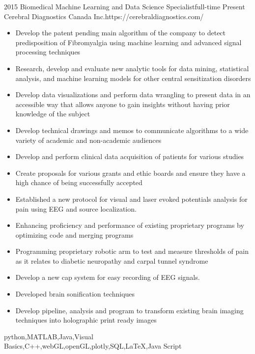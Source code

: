 \begin{experiences}
	\myExperience
	{2015}       {Biomedical Machine Learning and Data Science Specialist}{full-time}
	{Present}      {Cerebral Diagnostics Canada Inc.}{https://cerebraldiagnostics.com/}
	{
		\begin{itemize}
			\item  Develop the patent pending main algorithm of the company to detect predisposition of Fibromyalgia using machine learning and advanced signal processing techniques
			\item Research, develop and evaluate new analytic tools for data mining, statistical analysis, and machine learning models for other central sensitization disorders
			\item Develop data visualizations and perform data wrangling to present data in an accessible way that allows anyone to gain insights without having prior knowledge of the subject
			\item Develop technical drawings and memos to communicate algorithms to a wide variety of academic and non-academic audiences
			\item Develop and perform clinical data acquisition of patients for various studies
			\item Create proposals for various grants and ethic boards and ensure they have a high chance of being successfully accepted
			\item Established a new protocol for visual and laser evoked potentials analysis for pain using EEG and source localization.
			\item Enhancing proficiency and performance of existing proprietary programs by optimizing code and merging programs
			\item Programming proprietary robotic arm to test and measure thresholds of pain as it relates to diabetic neuropathy and carpal tunnel syndrome
			\item Develop a new cap system for easy recording of EEG signals. 
			\item Developed brain sonification techniques
			\item Develop pipeline, analysis and program to transform existing brain imaging techniques into holographic print ready images
		\end{itemize}
	}
	{python,MATLAB,Java,Visual Basics,C++,webGL,openGL,plotly,SQL,\LaTeX,Java Script}
	
	\emptySeparator
	

\end{experiences}
